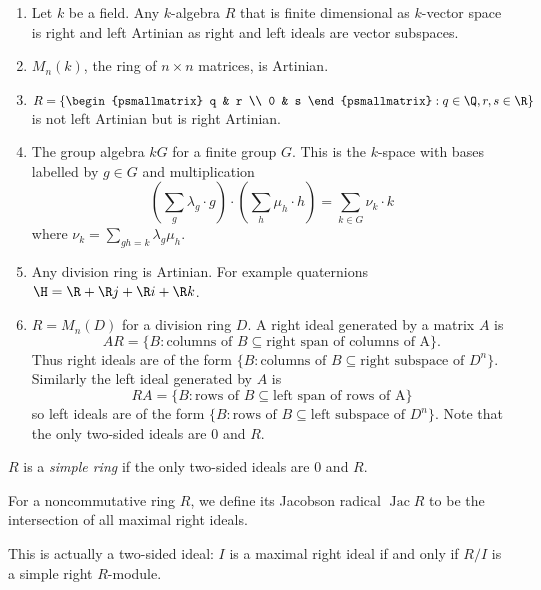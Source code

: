 \documentclass[a4paper]{article}
\DeclareMathOperator{\jac}{Jac} %
\begin{document}
\begin{eg}\leavevmode
  \begin{enumerate}
  \item Let \(k\) be a field. Any \(k\)-algebra \(R\) that is finite dimensional as \(k\)-vector space is right and left Artinian as right and left ideals are vector subspaces.
  \item \(M_n(k)\), the ring of \(n \times n\) matrices, is Artinian.
  \item \(R = \{
    \begin{psmallmatrix}
      q & r \\
      0 & s
    \end{psmallmatrix}
    : q \in \Q, r, s \in \R\}\) is not left Artinian but is right Artinian.
  \item The group algebra \(k G\) for a finite group \(G\). This is the \(k\)-space with bases labelled by \(g \in G\) and multiplication
    \[
      (\sum_g \lambda_g \cdot g) \cdot (\sum_h \mu_h \cdot h) = \sum_{k \in G} \nu_k \cdot k
    \]
    where \(\nu_k = \sum_{gh = k} \lambda_g \mu_h\).
  \item Any division ring is Artinian. For example quaternions \(\H = \R + \R j + \R i + \R k\).
  \item \(R = M_n(D)\) for a division ring \(D\). A right ideal generated by a matrix \(A\) is
    \[
      AR = \{B: \text{columns of } B \subseteq \text{right span of columns of A}\}.
    \]
    Thus right ideals are of the form \(\{B: \text{columns of } B \subseteq \text{right subspace of } D^n\}\). Similarly the left ideal generated by \(A\) is
    \[
      RA = \{B: \text{rows of } B \subseteq \text{left span of rows of A}\}
    \]
    so left ideals are of the form \(\{B: \text{rows of } B \subseteq \text{left subspace of } D^n\}\). Note that the only two-sided ideals are \(0\) and \(R\).
  \end{enumerate}
\end{eg}

\begin{definition}
  \(R\) is a \emph{simple ring} if the only two-sided ideals are \(0\) and \(R\).
\end{definition}

For a noncommutative ring \(R\), we define its Jacobson radical \(\jac R\) to be the intersection of all maximal right ideals.

\begin{remark}
  This is actually a two-sided ideal: \(I\) is a maximal right ideal if and only if \(R/I\) is a simple right \(R\)-module.
\end{remark}
\end{document}
